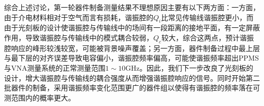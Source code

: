            综合上述讨论，第一轮器件制备测量结果不理想原因主要有以下两方面：一方面，由于介电材料相对于空气而言有损耗，谐振腔的$Q_i$比常见传输线谐振腔更小，而由于光刻板的设计使谐振腔与传输线中的场间有一段距离的接地平面，有一定屏蔽作用，导致谐振腔与传输线中的模式耦合较弱，$Q_c$较大，综合这两点，预计谐振腔响应的峰形较浅较宽，可能被背景噪声覆盖；另一方面，器件制备过程中最上层与最下层的对齐误差导致电容偏小，谐振腔频率偏高，可能使谐振频率超出PPMS与VNA测量系统的正常测量范围$1\sim 10$GHz。因此，我们下一步改良了光刻板的设计，增大谐振腔与传输线的耦合强度从而增强谐振腔响应的信号。同时开始第二批器件的制备，采用谐振频率变化范围更广的器件组以使得有谐振腔的频率落在可测范围内的概率更大。








